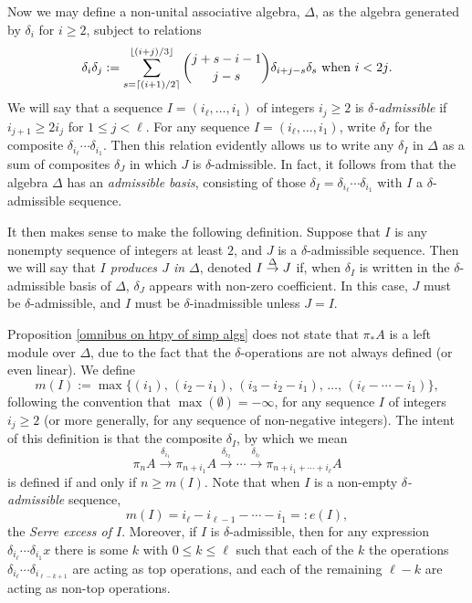\documentclass[11pt]{amsart}
\theoremstyle{plain}
\theoremstyle{definition}
\renewcommand{\to}{\longrightarrow}
\theoremstyle{plain}
\newcommand{\deltaalg}{\Delta} %
\newcommand{\minDimDelta}{m}
\newcommand{\produces}[3]{#3:#1\sim #2}
\renewcommand{\produces}[3]{#1\rightarrow_{#3} #2}%
\renewcommand{\produces}[3]{#1\overset{\smash{#3}}{\rightarrow} #2}%
\begin{document}
\begin{Constructing homotopy and cohomotopy operations}
Now we may define a non-unital associative algebra, $\deltaalg$, as the algebra generated by $\delta_i$ for $i\geq2$, subject to relations
\[\delta_i\delta_j:=\sum_{s=\lceil(i+1)/2\rceil}^{\lfloor(i+j)/3\rfloor}{j+s-i-1\choose j-s}\delta_{i+j-s}\delta_s\textup{ when $i<2j$}.\]
We will say that a sequence $I=(i_\ell,\ldots,i_1)$ of integers $i_j\geq2$ is \emph{$\delta$-admissible} if $i_{j+1}\geq 2i_j$ for $1\leq j <\ell$. For any sequence $I=(i_\ell,\ldots,i_1)$, write $\delta_I$ for the composite $\delta_{i_\ell}\cdots \delta_{i_1}$. Then this relation evidently allows us to write any $\delta_I$ in $\deltaalg$ as a sum of composites $\delta_J$ in which $J$ is $\delta$-admissible. In fact, it follows from \cite[Proposition 2.7]{MR1089001} that the algebra $\deltaalg$ has an \emph{admissible basis}, consisting of those $\delta_I=\delta_{i_\ell}\cdots \delta_{i_{1}}$ with $I$ a $\delta$-admissible sequence. 

It then makes sense to make the following definition. Suppose that $I$ is any nonempty sequence of integers at least $2$, and $J$ is a $\delta$-admissible sequence. Then we will say that \emph{$I$ produces $J$ in $\deltaalg$}, denoted $\produces{I}{J}{\deltaalg}$ if, when $\delta_I$ is written in the $\delta$-admissible basis of $\deltaalg$, $\delta_J$ appears with non-zero coefficient. In this case, $J$ must be $\delta$-admissible, and $I$ must be $\delta$-inadmissible unless $J=I$.

Proposition \ref{omnibus on htpy of simp algs} does not state that $\pi_*A$ is a left module over $\deltaalg$, due to the fact that the $\delta$-operations are not always defined (or even linear). We define
\[\minDimDelta(I):=\max\{(i_1),\,(i_2-i_1),\,(i_3-i_2-i_1),\,\ldots,\,(i_{\ell}-\cdots-i_1)\},
\]
following the convention that $\max(\emptyset)=-\infty$, for any sequence $I$ of integers $i_j\geq2$ (or more generally, for any sequence of non-negative integers).  The intent of this definition is that the composite $\delta_I$, by which we mean
\[\pi_{n}A\overset{\delta_{i_1}}{\to}\pi_{n+i_1}A\overset{\delta_{i_2}}{\to}\cdots \overset{\delta_{i_\ell}}{\to}\pi_{n+i_1+\cdots +i_\ell}A\]
is defined if and only if $n\geq \minDimDelta(I)$. 
Note that when $I$ is a non-empty \emph{$\delta$-admissible} sequence,
\[\minDimDelta(I)=i_{\ell}-i_{\ell-1}-\cdots -i_1=:e(I),\]
the \emph{Serre excess of $I$}. Moreover, if $I$ is $\delta$-admissible, then for any expression $\delta_{i_{\ell}}\cdots \delta_{i_{1}}x$ there is some $k$ with $0\leq k\leq \ell$ such that each of the $k$ the operations $\delta_{i_{\ell}}\cdots \delta_{i_{\ell-k+1}}$ are acting as top operations, and each of the remaining $\ell-k$ are acting as non-top operations.


\end{Constructing homotopy and cohomotopy operations}
\end{document}
